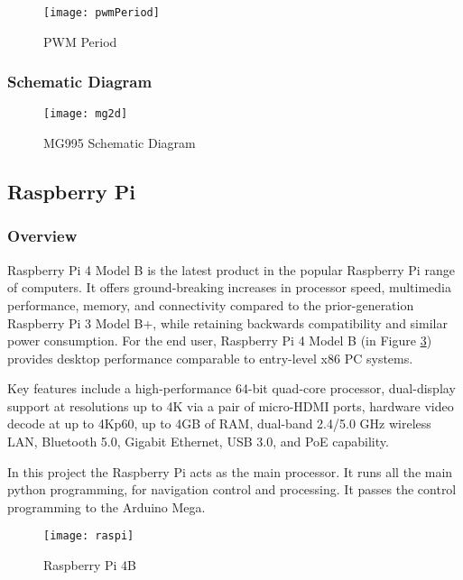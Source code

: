 \begin{figure}[H]
    \centering
        \texttt{[image: pwmPeriod]}
        \caption{PWM Period}
        \label{fig:pwmPeriod}
\end{figure}

\subsubsection{Schematic Diagram} 
\begin{figure}[H]
    \centering
        \texttt{[image: mg2d]}
        \caption{MG995 Schematic Diagram}
        \label{fig:mg2d}
\end{figure}


\newpage
\subsection{Raspberry Pi}
\subsubsection{Overview}

Raspberry Pi 4 Model B is the latest product in the popular Raspberry Pi range of computers. It offers ground-breaking increases in processor speed, multimedia performance, memory, and connectivity compared to the prior-generation Raspberry Pi 3 Model B+, while retaining backwards compatibility and similar power consumption. For the end user, Raspberry Pi 4 Model B (in Figure \ref{fig:raspi}) provides desktop performance comparable to entry-level x86 PC systems.

Key features include a high-performance 64-bit quad-core processor, dual-display support at resolutions up to 4K via a pair of micro-HDMI ports, hardware video decode at up to 4Kp60, up to 4GB of RAM, dual-band 2.4/5.0 GHz wireless LAN, Bluetooth 5.0, Gigabit Ethernet, USB 3.0, and PoE capability.

In this project the Raspberry Pi acts as the main processor. It runs all the main python programming, for navigation control and processing. It passes the control programming to the Arduino Mega.
\begin{figure}[H]
    \centering
        \texttt{[image: raspi]}
        \caption{Raspberry Pi 4B}
        \label{fig:raspi}
\end{figure}

